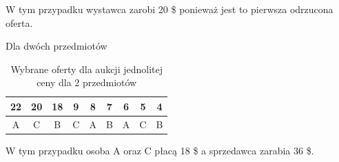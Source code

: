 \documentclass{article}
\begin{document}
W tym przypadku wystawca zarobi 20 \$ ponieważ jest to pierwsza odrzucona oferta.

Dla dwóch przedmiotów

\begin{table}[H]
	\centering
	\begin{tabular}{| >{\columncolor{orange}} c | >{\columncolor{orange}}c | >{\columncolor{green}}c |  c |  c |  c |  c |  c |  c |  }
		\hline
		22 & 20 & 18 & 9 & 8 & 7 & 6 & 5 & 4 \\
		\hline
		A  & C  & B  & C & A & B & A & C & B \\
		\hline
	\end{tabular}
	\caption{Wybrane oferty dla aukcji jednolitej ceny dla 2 przedmiotów}
\end{table}

W tym przypadku osoba A oraz C płacą 18 \$ a sprzedawca zarabia 36 \$.

\printbibliography
\end{document}
